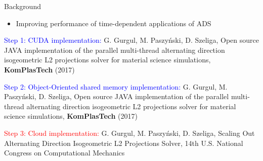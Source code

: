 \documentclass[c]{beamer}
\newcommand{\inred}[1]{\textcolor{red}{#1}}
\newcommand{\inblue}[1]{\textcolor{blue}{#1}}
\begin{document}
\begin{frame}{Background}

\begin{itemize}
  \item Improving performance of time-dependent applications of ADS
\end{itemize}

\inblue{Step 1: CUDA implementation: }\break
G. Gurgul, M. Paszy\'{n}ski, D. Szeliga, 
Open source JAVA implementation of the parallel multi-thread alternating direction isogeometric L2 projections solver for material science simulations, {\bf KomPlasTech} (2017) 

\inblue{Step 2: Object-Oriented shared memory implementation: }\break
G. Gurgul, M. Paszy\'{n}ski, D. Szeliga, 
Open source JAVA implementation of the parallel multi-thread alternating direction isogeometric L2 projections solver for material science simulations, {\bf KomPlasTech} (2017) 

\inred{Step 3: Cloud implementation: }\break
G. Gurgul, M. Paszy\'{n}ski, D. Szeliga, Scaling Out Alternating Direction Isogeometric L2 Projections Solver, 14th U.S. National Congress on Computational Mechanics


\end{frame}





\end{document}

